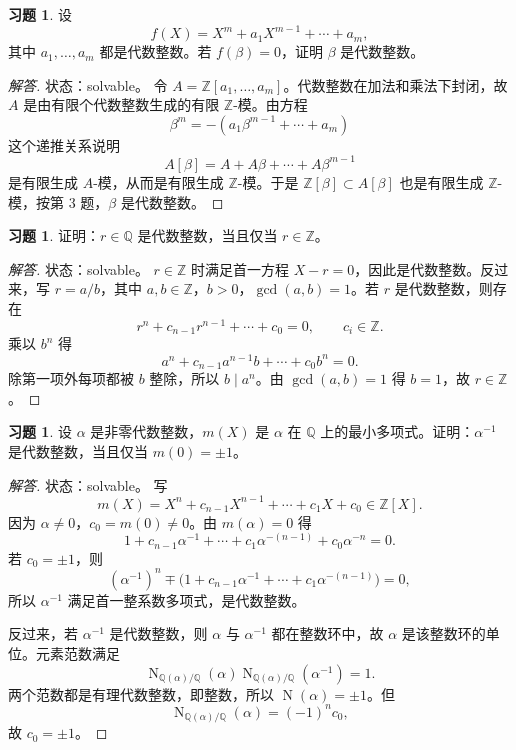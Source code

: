 \documentclass[11pt,a4paper,openany]{ctexbook}
\numberwithin{equation}{chapter}
\newcommand{\Q}{\mathbb{Q}}
\newcommand{\Z}{\mathbb{Z}}
\newcommand{\Nm}{\operatorname{N}}
\theoremstyle{plain}
\theoremstyle{definition}
\newtheorem{exercise}[theorem]{习题}
\theoremstyle{remark}
\begin{document}
\begin{exercise}
设
\[
f(X)=X^m+a_1X^{m-1}+\cdots+a_m,
\]
其中 $a_1,\dots,a_m$ 都是代数整数。若 $f(\beta)=0$，证明 $\beta$ 是代数整数。
\end{exercise}

\begin{proof}[解答]
状态：solvable。
令 $A=\Z[a_1,\dots,a_m]$。代数整数在加法和乘法下封闭，故 $A$ 是由有限个代数整数生成的有限 $\Z$-模。由方程
\[
\beta^m=-(a_1\beta^{m-1}+\cdots+a_m)
\]
这个递推关系说明
\[
A[\beta]=A+A\beta+\cdots+A\beta^{m-1}
\]
是有限生成 $A$-模，从而是有限生成 $\Z$-模。于是 $\Z[\beta]\subset A[\beta]$ 也是有限生成 $\Z$-模，按第 3 题，$\beta$ 是代数整数。
\end{proof}

\begin{exercise}
证明：$r\in\Q$ 是代数整数，当且仅当 $r\in\Z$。
\end{exercise}

\begin{proof}[解答]
状态：solvable。
$r\in\Z$ 时满足首一方程 $X-r=0$，因此是代数整数。反过来，写 $r=a/b$，其中 $a,b\in\Z$，$b>0$，$\gcd(a,b)=1$。若 $r$ 是代数整数，则存在
\[
r^n+c_{n-1}r^{n-1}+\cdots+c_0=0,\qquad c_i\in\Z.
\]
乘以 $b^n$ 得
\[
a^n+c_{n-1}a^{n-1}b+\cdots+c_0b^n=0.
\]
除第一项外每项都被 $b$ 整除，所以 $b\mid a^n$。由 $\gcd(a,b)=1$ 得 $b=1$，故 $r\in\Z$。
\end{proof}

\begin{exercise}
设 $\alpha$ 是非零代数整数，$m(X)$ 是 $\alpha$ 在 $\Q$ 上的最小多项式。证明：$\alpha^{-1}$ 是代数整数，当且仅当 $m(0)=\pm1$。
\end{exercise}

\begin{proof}[解答]
状态：solvable。
写
\[
m(X)=X^n+c_{n-1}X^{n-1}+\cdots+c_1X+c_0\in\Z[X].
\]
因为 $\alpha\ne0$，$c_0=m(0)\ne0$。由 $m(\alpha)=0$ 得
\[
1+c_{n-1}\alpha^{-1}+\cdots+c_1\alpha^{-(n-1)}+c_0\alpha^{-n}=0.
\]
若 $c_0=\pm1$，则
\[
(\alpha^{-1})^n\mp\bigl(1+c_{n-1}\alpha^{-1}+\cdots+c_1\alpha^{-(n-1)}\bigr)=0,
\]
所以 $\alpha^{-1}$ 满足首一整系数多项式，是代数整数。

反过来，若 $\alpha^{-1}$ 是代数整数，则 $\alpha$ 与 $\alpha^{-1}$ 都在整数环中，故 $\alpha$ 是该整数环的单位。元素范数满足
\[
\Nm_{\Q(\alpha)/\Q}(\alpha)\Nm_{\Q(\alpha)/\Q}(\alpha^{-1})=1.
\]
两个范数都是有理代数整数，即整数，所以 $\Nm(\alpha)=\pm1$。但
\[
\Nm_{\Q(\alpha)/\Q}(\alpha)=(-1)^n c_0,
\]
故 $c_0=\pm1$。
\end{proof}
\end{document}
